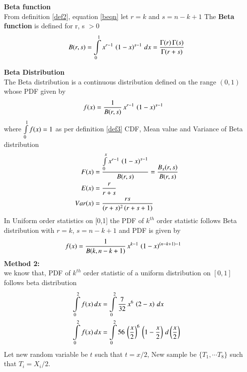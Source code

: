\documentclass[journal,12pt,twocolumn]{IEEEtran}
\begin{document}
\begin{definition}
\textbf{Beta function}\\
From definition \eqref{def2}, equation \eqref{beqn} let $r = k$ and $s = n-k+1$ The \textbf{Beta function} is
defined for r, s $> 0$
\begin{equation}
B(r,s) = \int\limits_{0}^{1} x^{r-1}\,\left(1-x\right)^{s-1}\,dx = \dfrac{\Gamma(r)\,\Gamma(s)}{\Gamma(r+s)} 
\label{eqn_5}
\end{equation}
\end{definition}
\textbf{Beta Distribution} \\
The Beta distribution is a continuous distribution defined on the range $(0,1)$ whose PDF given by 
\begin{align}
f(x) &= \dfrac{1}{B(r,s)}\,x^{r-1}\,\left(1-x\right)^{s-1} 
\end{align}
where $\int\limits_{0}^1f(x) = 1$ as per definition \eqref{def3} 
\newpage
CDF, Mean value and Variance of Beta distribution
\begin{align}
 F(x)   &=\dfrac{\int\limits_{0}^{x}x^{r-1}\,\left(1-x\right)^{s-1}}{B(r,s)} =    \dfrac{B_{x}(r,s)}{B(r,s)} \\
 E(x)   &=   \dfrac{r}{r+s} \\
 Var(x) &= \dfrac{rs}{(r+s)^{2}\,(r+s+1)}
\end{align}
In Uniform order statistics on [0,1] the PDF of $k^{th}$ order statistic follows Beta distribution with $r=k$, $s=n-k+1$ and PDF is given by 
\begin{align}
f(x) &= \dfrac{1}{B(k,n-k+1)}\,x^{k-1}\,\left(1-x\right)^{(n-k+1)-1} 
\end{align}
\textbf{Method 2:}\\
we know that, PDF of $k^{th}$ order statistic of a uniform distribution on $[0,1]$ follows 
beta distribution
\begin{align}
\int\limits_{0}^{2}f(x)\,dx &= \int\limits_{0}^{2} \dfrac{7}{32}\,x^{6}\,\left(2-x\right)\,dx \\
\int\limits_{0}^{2}f(x)\,dx &= \int\limits_{0}^{2} 56\,\left(\dfrac{x}{2}\right)^{6}\,\left(1-\dfrac{x}{2}\right)\,d\left(\dfrac{x}{2}\right)
\end{align}
Let new random variable be $t$ such that $t=x/2$, New sample be $\{T_1,\cdots T_8\}$ such that $T_{i}=X_{i}/2$.
\end{document}
